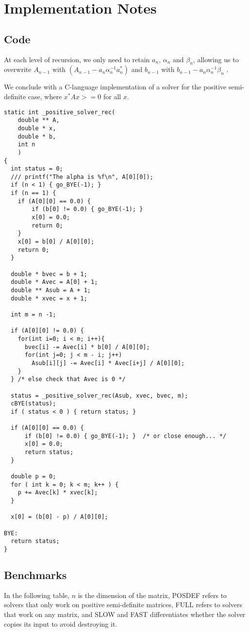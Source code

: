 \documentclass[12pt]{article}
\begin{document}
\section{Implementation Notes}
\subsection{Code}
At each level of recursion, we only need to retain
$a_n$,
$\alpha_n$
and
$\beta_n$, allowing us to overwrite
$A_{n-1}$
with $(A_{n-1} - a_n\alpha_n^{-1}a_n^*)$
and
$b_{n-1}$ with
$b_{n-1}-a_n\alpha_n^{-1}\beta_n$
.

We conclude with a C-language implementation of a solver for the positive semi-definite case, where
$x^*Ax >=0 $ for all $x$.

\begin{verbatim}
static int _positive_solver_rec(
    double ** A,
    double * x,
    double * b,
    int n
    )
{
  int status = 0;
  /// printf("The alpha is %f\n", A[0][0]);
  if (n < 1) { go_BYE(-1); }
  if (n == 1) {
    if (A[0][0] == 0.0) {
        if (b[0] != 0.0) { go_BYE(-1); }
        x[0] = 0.0;
        return 0;
    }
    x[0] = b[0] / A[0][0];
    return 0;
  }

  double * bvec = b + 1;
  double * Avec = A[0] + 1;
  double ** Asub = A + 1;
  double * xvec = x + 1;

  int m = n -1;

  if (A[0][0] != 0.0) {
    for(int i=0; i < m; i++){
      bvec[i] -= Avec[i] * b[0] / A[0][0];
      for(int j=0; j < m - i; j++)
        Asub[i][j] -= Avec[i] * Avec[i+j] / A[0][0];
    }
  } /* else check that Avec is 0 */

  status = _positive_solver_rec(Asub, xvec, bvec, m);
  cBYE(status);
  if ( status < 0 ) { return status; }

  if (A[0][0] == 0.0) {
      if (b[0] != 0.0) { go_BYE(-1); }  /* or close enough... */
      x[0] = 0.0;
      return status;
  }

  double p = 0;
  for ( int k = 0; k < m; k++ ) {
    p += Avec[k] * xvec[k];
  }

  x[0] = (b[0] - p) / A[0][0];

BYE:
  return status;
}
\end{verbatim}

\subsection{Benchmarks}

In the following table, $n$ is the dimension of the matrix,
POSDEF refers to solvers that only work on positive
semi-definite matrices, FULL refers to solvers that work on any matrix, and SLOW
and FAST differentiates whether the solver copies its input to avoid destroying
it.
\end{document}
